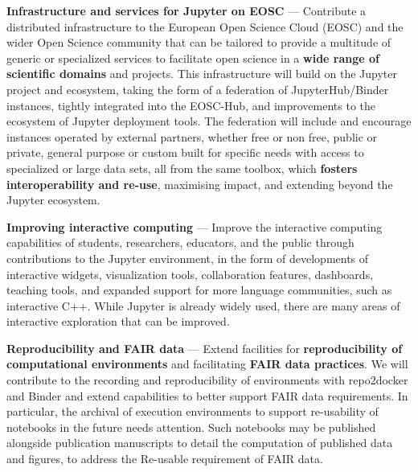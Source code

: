 \begin{compactenum}

\item \label{obj:deployment}
  \textbf{Infrastructure and services for Jupyter on EOSC} ---
  Contribute a distributed infrastructure to the European Open Science Cloud
  (EOSC) and the wider Open Science community that can be tailored to
  provide a multitude of generic or specialized services to facilitate
  open science in a \textbf{wide range of scientific domains} and projects.
  This infrastructure will build on the Jupyter project and ecosystem,
  taking the form of a federation of JupyterHub/Binder instances,
  tightly integrated into the EOSC-Hub,
  and improvements to the ecosystem of Jupyter deployment tools.
  The federation will include and encourage instances operated by
  external partners, whether free or non free, public or private,
  general purpose or custom built for specific needs
  with access to specialized or large data sets,
  all from the same toolbox,
  which \textbf{fosters interoperability and re-use},
  maximising impact,
  and extending beyond the Jupyter ecosystem.

\item \label{obj:interactivity}
  \textbf{Improving interactive computing} ---
  Improve the interactive computing capabilities of
  students, researchers, educators, and the public
  through contributions to the Jupyter environment,
  in the form of developments of interactive widgets,
  visualization tools, collaboration features, dashboards,
  teaching tools,
  and expanded support for more language communities,
  such as interactive C++.
  While Jupyter is already widely used,
  there are many areas
  of interactive exploration that can be improved.

\item \label{obj:reusability}
  \textbf{Reproducibility and FAIR data} ---
  Extend facilities for
  \textbf{reproducibility of computational environments}
  and facilitating \textbf{FAIR data practices}.
  We will contribute to the recording and reproducibility
  of environments with repo2docker and Binder
  and extend capabilities to better support FAIR
  data requirements. In particular, the archival of execution
  environments to support re-usability of notebooks in the future
  needs attention. Such notebooks may be published alongside
  publication manuscripts to detail the computation of published data
  and figures, to address the Re-usable requirement of FAIR data.


\end{compactenum}
